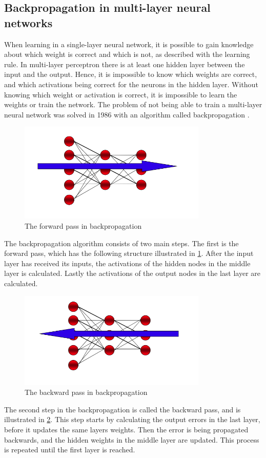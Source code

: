\documentclass[USenglish]{ifimaster}  %
\begin{document}
\subsection{Backpropagation in multi-layer neural networks}
When learning in a single-layer neural network, it is possible to gain knowledge about which weight is correct and which is not, as described with the learning rule. In multi-layer perceptron there is at least one hidden layer between the input and the output. Hence, it is impossible to know which weights are correct, and which activations being correct for the neurons in the hidden layer. Without knowing which weight or activation is correct, it is impossible to learn the weights or train the network. The problem of not being able to train a multi-layer neural network was solved in 1986 with an algorithm called backpropagation \cite{Rumelhart:1986:LIR:104279.104293}.
\begin{figure}[H]
    \centering
    \includegraphics[width=0.8\textwidth]{bilder/forward_prop.png}
    \caption{The forward pass in backpropagation \cite{website:inf_4490_mlp}}
    \label{fig:forward_step}
\end{figure}
The backpropagation algorithm consists of two main steps. The first is the forward pass, which has the following structure illustrated in \cref{fig:forward_step}. After the input layer has received its inputs, the activations of the hidden nodes in the middle layer is calculated. Lastly the activations of the output nodes in the last layer are calculated. 
\begin{figure}[H]
    \centering
    \includegraphics[width=0.8\textwidth]{bilder/backward_prop.png}
    \caption{The backward pass in backpropagation \cite{website:inf_4490_mlp}}
    \label{fig:backward_step}
\end{figure}
The second step in the backpropagation is called the backward pass, and is illustrated in \cref{fig:backward_step}. This step starts by calculating the output errors in the last layer, before it updates the same layers weights. Then the error is being propagated backwards, and the hidden weights in the middle layer are updated. This process is repeated until the first layer is reached.
\end{document}
